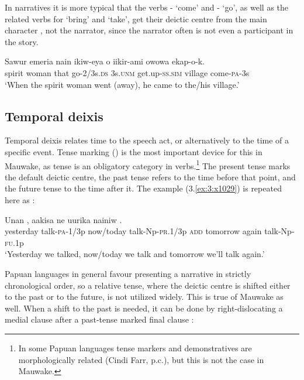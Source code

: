 In narratives it is more typical that the verbs - `come' and - `go', as well as the related verbs for `bring' and `take', get their deictic centre from the main character , not the narrator, since the narrator often is not even a participant in the story. 

\ea%
\label{ex:6:x1277}
\gll Sawur  emeria  nain  ikiw-eya  o  iikir-ami  owowa ekap-o-k. \\
spirit  woman  that  go-2/3s.\textsc{ds}  3s.\textsc{unm}  get.up-\textsc{ss}.\textsc{sim}  village come-\textsc{pa}-3s\\
\glt `When the spirit woman went (away), he came to the/his village.'
\z

\subsection{Temporal deixis}

Temporal deixis relates time to the speech act, or alternatively to the time of a specific event. Tense marking () is the most important device for this in Mauwake, as tense is an obligatory category in verbs.\footnote{In some Papuan languages tense markers and demonstratives are morphologically related (Cindi Farr, p.c.), but this is not the case in Mauwake.} The present tense marks the default deictic centre, the past tense refers to the time before that point, and the future tense to the time after it. The example (3.\ref{ex:3:x1029}) 
is repeated here as :

\ea%
\label{ex:6:x1893}
\gll Unan  ,  aakisa    ne uurika  nainiw  .\\
yesterday  talk-\textsc{pa}-1/3p  now/today  talk-Np-\textsc{pr}.1/3p  \textsc{add} tomorrow  again  talk-Np-\textsc{fu}.1p\\
\glt `Yesterday we talked, now/today we talk and tomorrow we'll talk again.'
\z

Papuan languages in general favour presenting a narrative in strictly chronological order, so a relative tense, where the deictic centre is shifted either to the past or to the future, is not utilized widely. This is true of Mauwake as well. When a shift to the past is needed, it can be done by right-dislocating a medial clause after a past-tense marked final clause : 

